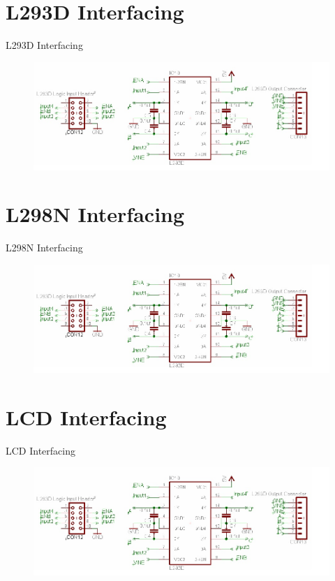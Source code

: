 \documentclass[10pt, a4paper]{beamer}
\begin{document}
\section{L293D Interfacing}
\begin{frame}{L293D Interfacing}
	\begin{figure}
		\includegraphics[scale=0.4]{L293d.jpg}
	\end{figure}
\end{frame}

\section{L298N Interfacing}
\begin{frame}{L298N Interfacing}
	\begin{figure}
		\includegraphics[scale=0.4]{L293d.jpg}
	\end{figure}
\end{frame}

\section{LCD Interfacing}
\begin{frame}{LCD Interfacing}
	\begin{figure}
		\includegraphics[scale=0.4]{L293d.jpg}
	\end{figure}
\end{frame}
\end{document}
